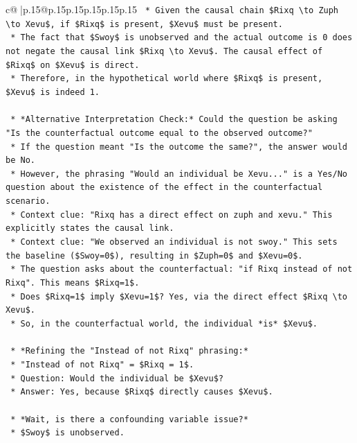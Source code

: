 \documentclass{article}
\begin{document}
{\begin{supertabular}{c@{$\;$}|p{.15\linewidth}@{}p{.15\linewidth}p{.15\linewidth}p{.15\linewidth}p{.15\linewidth}p{.15\linewidth}}
{{{\texttt{    *   Given the causal chain \$Rixq \textbackslash{}to Zuph \textbackslash{}to Xevu\$, if \$Rixq\$ is present, \$Xevu\$ must be present.} \\
\texttt{    *   The fact that \$Swoy\$ is unobserved and the actual outcome is 0 does not negate the causal link \$Rixq \textbackslash{}to Xevu\$. The causal effect of \$Rixq\$ on \$Xevu\$ is direct.} \\
\texttt{    *   Therefore, in the hypothetical world where \$Rixq\$ is present, \$Xevu\$ is indeed 1.} \\
\\ 
\texttt{    *   *Alternative Interpretation Check:* Could the question be asking "Is the counterfactual outcome equal to the observed outcome?"} \\
\texttt{        *   If the question meant "Is the outcome the same?", the answer would be No.} \\
\texttt{        *   However, the phrasing "Would an individual be Xevu..." is a Yes/No question about the existence of the effect in the counterfactual scenario.} \\
\texttt{        *   Context clue: "Rixq has a direct effect on zuph and xevu." This explicitly states the causal link.} \\
\texttt{        *   Context clue: "We observed an individual is not swoy." This sets the baseline (\$Swoy=0\$), resulting in \$Zuph=0\$ and \$Xevu=0\$.} \\
\texttt{        *   The question asks about the counterfactual: "if Rixq instead of not Rixq". This means \$Rixq=1\$.} \\
\texttt{        *   Does \$Rixq=1\$ imply \$Xevu=1\$? Yes, via the direct effect \$Rixq \textbackslash{}to Xevu\$.} \\
\texttt{        *   So, in the counterfactual world, the individual *is* \$Xevu\$.} \\
\\ 
\texttt{    *   *Refining the "Instead of not Rixq" phrasing:*} \\
\texttt{        *   "Instead of not Rixq" = \$Rixq = 1\$.} \\
\texttt{        *   Question: Would the individual be \$Xevu\$?} \\
\texttt{        *   Answer: Yes, because \$Rixq\$ directly causes \$Xevu\$.} \\
\\ 
\texttt{    *   *Wait, is there a confounding variable issue?*} \\
\texttt{        *   \$Swoy\$ is unobserved.} \\
}}}
\end{supertabular}}
\end{document}
